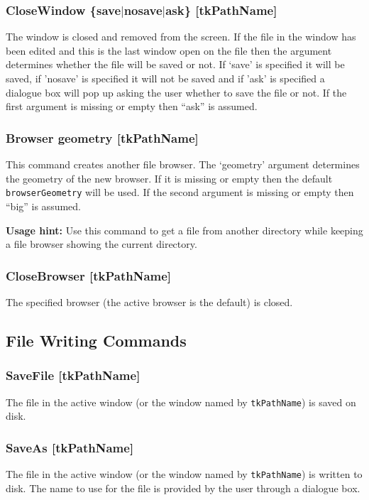 \subsubsection{CloseWindow \{save$\mid$nosave$\mid$ask\} [tkPathName]}
The window is closed and removed from the screen.
If the file in the window has been edited and this is the last window
open on the file then the argument determines whether the
file will be saved or not.
If `save' is specified it will be saved, if 'nosave' is specified
it will not be saved and if 'ask' is specified a dialogue box
will pop up asking the user whether to save the file or not.
If the first argument is missing or empty then ``ask'' is assumed.

\subsubsection{Browser geometry [tkPathName]}
This command creates another file browser.
The `geometry' argument determines the geometry of the new browser.
If it is missing or empty then the default {\tt browserGeometry} will be used.
If the second argument is missing or empty then ``big'' is assumed.

{\bf Usage hint:} Use this command to get a file from another directory
while keeping a file browser showing the current directory.

\subsubsection{CloseBrowser [tkPathName]}
The specified browser (the active browser is the default) is closed.




\subsection{File Writing Commands}


\subsubsection{SaveFile [tkPathName]}
The file in the active window (or the window named by {\tt tkPathName})
is saved on disk.

\subsubsection{SaveAs [tkPathName]}
The file in the active window (or the window named by {\tt tkPathName})
is written to disk.
The name to use for the file is provided by the user through a dialogue box.

